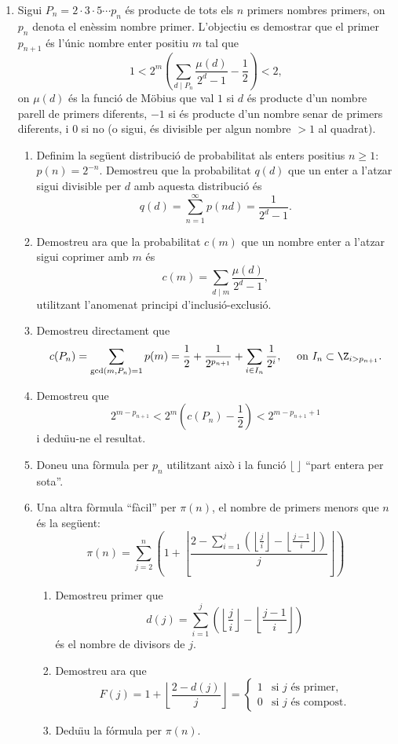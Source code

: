 \begin{enumerate}[leftmargin=*]
\item Sigui $P_n=2\cdot 3 \cdot 5 \cdots p_n$ és producte de
tots els $n$ primers nombres primers, on $p_n$ denota el en\`{e}ssim
nombre primer. L'objectiu es demostrar que el primer $p_{n+1}$ és
l'únic nombre enter positiu $m$ tal que
$$1<2^m\left(\sum_{d\mid P_n} \frac{\mu(d)}{2^d-1} - \frac 12
\right)<2,$$ on $\mu(d)$ és la funció de M\"{o}bius que val $1$ si $d$
és producte d'un nombre parell de primers diferents, $-1$ si és
producte d'un nombre senar de primers diferents, i $0$ si no (o
sigui, és divisible per algun nombre $>1$ al quadrat).

\begin{enumerate}
\item Definim la seg\"{u}ent distribució de probabilitat als enters positius
$n\ge 1$: $p(n)=2^{-n}$. Demostreu que la probabilitat $q(d)$ que un
enter a l'atzar sigui divisible per $d$ amb aquesta distribució és
$$q(d)=\sum_{n=1}^{\infty} p(nd)=\frac{1}{2^d-1}.$$
\item Demostreu ara que la probabilitat $c(m)$ que un nombre enter a
l'atzar sigui coprimer amb $m$ és
$$c(m)=\sum_{d\mid m} \frac{\mu(d)}{2^d-1},$$
utilitzant l'anomenat principi d'inclusió-exclusió.
\item Demostreu directament que
\[c(P_n)=\sum_{\gcd(m,P_n)=1} p(m)= \frac 12 + \frac{1}{2^{p_{n+1}}} +
\sum_{i\in I_n}\frac{1}{2^i},\quad\text{ on  } I_n\subset \Z_{i>p_{n+1}}.\]
\item Demostreu que $$2^{m-p_{n+1}}<2^{m}\left(c(P_n)-\frac12\right) <2^{m-p_{n+1}+1}$$
i dedu\"{\i}u-ne el resultat.
\item Doneu una fòrmula per $p_n$ utilitzant això i la funció $\lfloor\
\rfloor$ ``part entera per sota''.
\item Una altra fòrmula ``fàcil'' per $\pi(n)$, el nombre de primers
menors que $n$ és la seg\"{u}ent:
$$ \pi(n)=\sum_{j=2}^n \left( 1 + \left\lfloor
\frac{2-\sum_{i=1}^j \left( \left\lfloor\frac
{j}{i}\right\rfloor-\left\lfloor\frac {j-1}{i}\right\rfloor\right)}
{j} \right\rfloor \right)$$
\begin{enumerate}
\item Demostreu primer que
$$d(j)=\sum_{i=1}^j \left( \left\lfloor\frac
{j}{i}\right\rfloor-\left\lfloor\frac {j-1}{i}\right\rfloor\right)$$
és el nombre de divisors de $j$.
\item Demostreu ara que
\[F(j)= 1 + \left\lfloor
\frac{2-d(j)} {j} \right\rfloor =
\begin{cases}
1 & \text{si $j$ és primer},\\
0 & \text{si $j$ és compost}.
\end{cases}
\]
\item Dedu\"{\i}u la fórmula per $\pi(n)$.
\end{enumerate}


\end{enumerate}
\end{enumerate}
